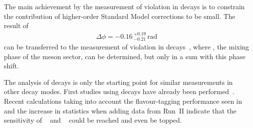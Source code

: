The main achievement by the measurement of \CP violation in \BdToDD decays is
to constrain the contribution of higher-order Standard Model corrections to be
small. The result of
\begin{align*}
	\Delta \phi = -0.16\,^{+0.19}_{-0.21}\,\si{\radian}
\end{align*}
can be transferred to the measurement of \CP violation in \BsToDsDs
decays~\cite{LHCb-PAPER-2014-051}, where \phis, the mixing phase of the \Bs
meson sector, can be determined, but only in a sum with this phase shift.

The analysis of \BdToDD decays is only the starting point for similar
measurements in other \allBToDD decay modes. First studies using \BdToDstD
decays have already been performed~\cite{BToDstDthesis}. Recent calculations
taking into account the flavour-tagging performance seen in \BdToDD and the
increase in statistics when adding data from Run~II indicate that the
sensitivity of \babar~\cite{Aubert:2008ah} and \belle~\cite{Rohrken:2012ta}
could be reached and even be topped.

